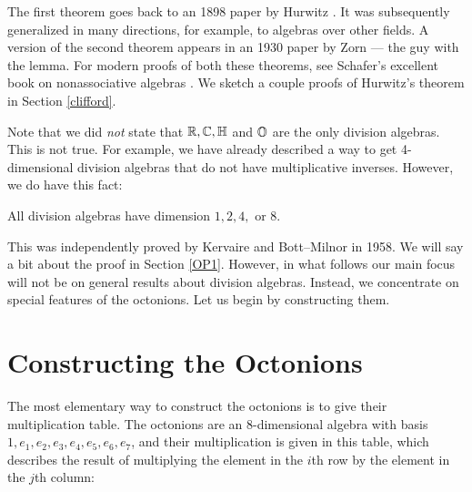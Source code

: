 The first theorem goes back to an 1898 paper by Hurwitz \cite{Hurwitz}. 
It was subsequently generalized in many directions, for example, to  
algebras over other fields.   A version of the second theorem appears in
an 1930 paper by Zorn \cite{Zorn} --- the guy with the lemma.  For
modern proofs of both these theorems, see Schafer's excellent book on
nonassociative algebras \cite{Schafer}.  We sketch a couple proofs of
Hurwitz's theorem in Section \ref{clifford}.  

Note that we did {\it not} state that ${\mathbb R},{\mathbb C},{\mathbb H}$ and ${\mathbb O}$ are the only   
division algebras.  This is not true.  For example, we have already  
described a way to get 4-dimensional division algebras that do not have  
multiplicative inverses.  However, we do have this fact:   

\begin{thm} \et \label{bott-milnor}  All division algebras have dimension    
$1, 2, 4,$ or $8$.    
\end{thm}  

\noindent
This was independently proved by Kervaire \cite{Kervaire} and
Bott--Milnor \cite{BM} in 1958.  We will say a bit about the proof in
Section \ref{OP1}.  However, in what follows our main focus will not be
on general results about division algebras.  Instead, we concentrate on
special features of the octonions.  Let us begin by constructing them.
  
\section{Constructing the Octonions} \label{constructing}   
   
The most elementary way to construct the octonions is to give their   
multiplication table.  The octonions are an 8-dimensional algebra   
with basis $1, e_1,e_2,e_3,e_4,e_5,e_6,e_7$,    
and their multiplication is given in this table, which describes   
the result of multiplying the element in the $i$th row by the   
element in the $j$th column:   
   
